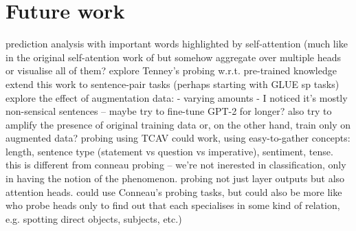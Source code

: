 \documentclass[bsc,frontabs,singlespacing,parskip,deptreport]{infthesis}
\begin{document}
\chapter{Future work}{
  prediction analysis with important words highlighted by self-attention (much like in the original self-atention work of \citet{Lin_2017} but somehow aggregate over multiple heads or visualise all of them?
  explore Tenney's probing w.r.t. pre-trained knowledge
  extend this work to sentence-pair tasks (perhaps starting with GLUE sp tasks)
  explore the effect of augmentation data:
  - varying amounts
  - I noticed it's mostly non-sensical sentences -- maybe try to fine-tune GPT-2 for longer? also try to amplify the presence of original training data or, on the other hand, train only on augmented data?
  probing using TCAV \citep{Kim_2017} could work, using easy-to-gather concepts: length, sentence type (statement vs question vs imperative), sentiment, tense. this is different from conneau probing -- we're not inerested in classification, only in having the notion of the phenomenon.
  probing not just layer outputs but also attention heads. could use Conneau's probing tasks, but could also be more like \citet{Clark_2019} who probe heads only to find out that each specialises in some kind of relation, e.g. spotting direct objects, subjects, etc.)
}




\appendix
\end{document}
